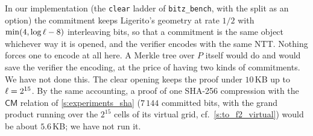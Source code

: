\documentclass[11pt,letterpaper,usenames,dvipsnames]{article}
\begin{document}
\begin{remark}
In our implementation (the \texttt{clear} ladder of \texttt{bitz\_bench}, with the split as an option) the commitment keeps Ligerito's geometry at rate $1/2$ with $\min(4,\log\ell-8)$ interleaving bits, so that a commitment is the same object whichever way it is opened, and the verifier encodes with the same NTT. Nothing forces one to encode at all here. A Merkle tree over $P$ itself would do and would save the verifier the encoding, at the price of having two kinds of commitments. We have not done this. The clear opening keeps the proof under $10$\,KB up to $\ell=2^{15}$. By the same accounting, a proof of one SHA-256 compression with the $\mathsf{CM}$ relation of \cref{s:experiments_sha} ($7\,144$ committed bits, with the grand product running over the $2^{15}$ cells of its virtual grid, cf.\ \cref{s:to_f2_virtual}) would be about $5.6$\,KB; we have not run it.
\end{remark}



\end{document}
